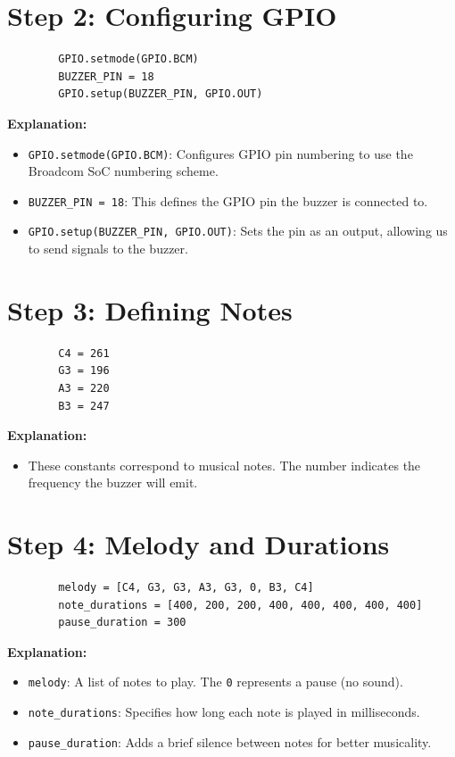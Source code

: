\documentclass{article}
\begin{document}
	\section*{Step 2: Configuring GPIO}
	\begin{lstlisting}
		GPIO.setmode(GPIO.BCM)
		BUZZER_PIN = 18
		GPIO.setup(BUZZER_PIN, GPIO.OUT)
	\end{lstlisting}
	
	\textbf{Explanation:}
	\begin{itemize}
		\item \texttt{GPIO.setmode(GPIO.BCM)}: Configures GPIO pin numbering to use the Broadcom SoC numbering scheme.
		\item \texttt{BUZZER\_PIN = 18}: This defines the GPIO pin the buzzer is connected to.
		\item \texttt{GPIO.setup(BUZZER\_PIN, GPIO.OUT)}: Sets the pin as an output, allowing us to send signals to the buzzer.
	\end{itemize}
	
	\section*{Step 3: Defining Notes}
	\begin{lstlisting}
		C4 = 261
		G3 = 196
		A3 = 220
		B3 = 247
	\end{lstlisting}
	
	\textbf{Explanation:}
	\begin{itemize}
		\item These constants correspond to musical notes. The number indicates the frequency the buzzer will emit.
	\end{itemize}
	
	\section*{Step 4: Melody and Durations}
	\begin{lstlisting}
		melody = [C4, G3, G3, A3, G3, 0, B3, C4]
		note_durations = [400, 200, 200, 400, 400, 400, 400, 400]
		pause_duration = 300
	\end{lstlisting}
	
	\textbf{Explanation:}
	\begin{itemize}
		\item \texttt{melody}: A list of notes to play. The \texttt{0} represents a pause (no sound).
		\item \texttt{note\_durations}: Specifies how long each note is played in milliseconds.
		\item \texttt{pause\_duration}: Adds a brief silence between notes for better musicality.
	\end{itemize}
	
\end{document}

